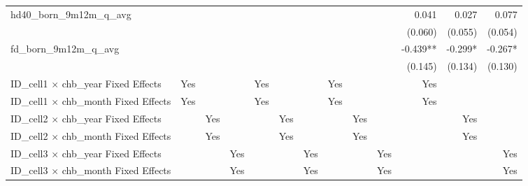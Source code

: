 \begin{tabular}{lrrrrrrrrrrrr}
hd40\_born\_9m12m\_q\_avg                   &              &              &              &              &              &              &              &              &              &        0.041 &        0.027 &        0.077 \\ 
                                            &              &              &              &              &              &              &              &              &              &      (0.060) &      (0.055) &      (0.054) \\ 
fd\_born\_9m12m\_q\_avg                     &              &              &              &              &              &              &              &              &              &     -0.439** &      -0.299* &      -0.267* \\ 
                                            &              &              &              &              &              &              &              &              &              &      (0.145) &      (0.134) &      (0.130) \\ 
\midrule
ID\_cell1 $\times$ chb\_year Fixed Effects  &          Yes &              &              &          Yes &              &              &          Yes &              &              &          Yes &              &              \\ 
ID\_cell1 $\times$ chb\_month Fixed Effects &          Yes &              &              &          Yes &              &              &          Yes &              &              &          Yes &              &              \\ 
ID\_cell2 $\times$ chb\_year Fixed Effects  &              &          Yes &              &              &          Yes &              &              &          Yes &              &              &          Yes &              \\ 
ID\_cell2 $\times$ chb\_month Fixed Effects &              &          Yes &              &              &          Yes &              &              &          Yes &              &              &          Yes &              \\ 
ID\_cell3 $\times$ chb\_year Fixed Effects  &              &              &          Yes &              &              &          Yes &              &              &          Yes &              &              &          Yes \\ 
ID\_cell3 $\times$ chb\_month Fixed Effects &              &              &          Yes &              &              &          Yes &              &              &          Yes &              &              &          Yes \\ 

\end{tabular}
